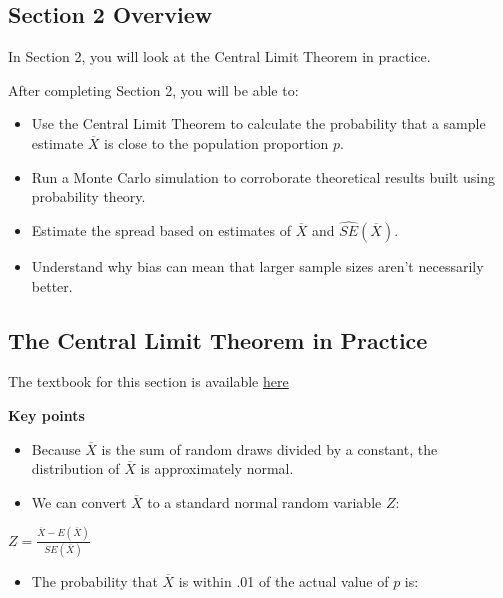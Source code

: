 \documentclass[
]{article}
\providecommand{\tightlist}{%
  \setlength{\itemsep}{0pt}\setlength{\parskip}{0pt}}
\begin{document}
\hypertarget{section-2-overview}{%
\subsection{Section 2 Overview}\label{section-2-overview}}

In Section 2, you will look at the Central Limit Theorem in practice.

After completing Section 2, you will be able to:

\begin{itemize}
\tightlist
\item
  Use the Central Limit Theorem to calculate the probability that a
  sample estimate \(\overline{X}\) is close to the population proportion
  \(p\).
\item
  Run a Monte Carlo simulation to corroborate theoretical results built
  using probability theory.
\item
  Estimate the spread based on estimates of \(\overline{X}\) and
  \(\hat{SE}(\overline{X})\).
\item
  Understand why bias can mean that larger sample sizes aren't
  necessarily better.
\end{itemize}

\hypertarget{the-central-limit-theorem-in-practice}{%
\subsection{The Central Limit Theorem in
Practice}\label{the-central-limit-theorem-in-practice}}

The textbook for this section is available
\href{https://rafalab.github.io/dsbook/inference.html\#clt}{here}

\textbf{Key points}

\begin{itemize}
\tightlist
\item
  Because \(\overline{X}\) is the sum of random draws divided by a
  constant, the distribution of \(\overline{X}\) is approximately
  normal.
\item
  We can convert \(\overline{X}\) to a standard normal random variable
  \(Z\):
\end{itemize}

\(Z = \frac{\overline{X} - E(\overline{X})}{SE(\overline{X})}\)

\begin{itemize}
\tightlist
\item
  The probability that \(\overline{X}\) is within .01 of the actual
  value of \(p\) is:
\end{itemize}
\end{document}
